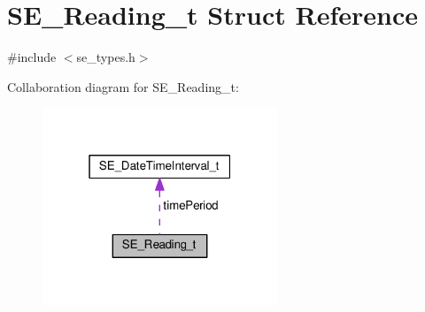 \hypertarget{structSE__Reading__t}{}\section{S\+E\+\_\+\+Reading\+\_\+t Struct Reference}
\label{structSE__Reading__t}


{\ttfamily \#include $<$se\+\_\+types.\+h$>$}



Collaboration diagram for S\+E\+\_\+\+Reading\+\_\+t\+:\nopagebreak
\begin{figure}[H]
\begin{center}
\leavevmode
\includegraphics[width=199pt]{structSE__Reading__t__coll__graph}
\end{center}
\end{figure}
